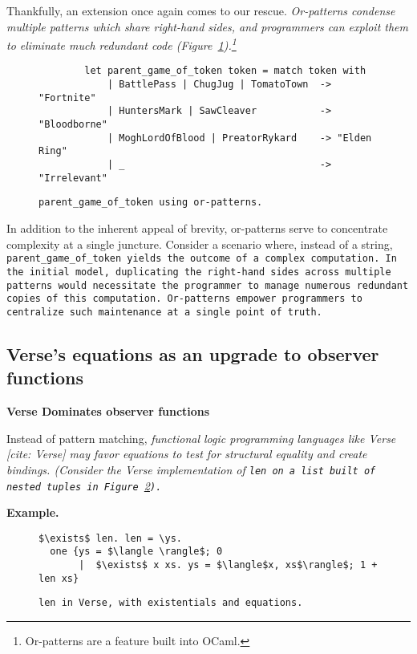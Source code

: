 \documentclass[manuscript,screen,review, 12pt]{acmart}
\begin{document}
\begin{outline}[enumerate]
Thankfully, an extension once again comes to our rescue. \it{Or-patterns}
condense multiple patterns which share right-hand sides, and programmers can
exploit them to eliminate much redundant code
(Figure~\ref{fig:orpgot}).\footnote{Or-patterns are a feature built into OCaml.}

    \begin{figure}
    \begin{center}
    \begin{verbatim}
        let parent_game_of_token token = match token with 
            | BattlePass | ChugJug | TomatoTown  -> "Fortnite"
            | HuntersMark | SawCleaver           -> "Bloodborne"
            | MoghLordOfBlood | PreatorRykard    -> "Elden Ring"
            | _                                  -> "Irrelevant"
    \end{verbatim}
    \end{center}    
    \caption{\tt{parent\_game\_of\_token} using or-patterns.} 
    \label{fig:orpgot}
    \end{figure}

    In addition to the inherent appeal of brevity, or-patterns serve to
    concentrate complexity at a single juncture. Consider a scenario where,
    instead of a string, \tt{parent\_game\_of\_token} yields the outcome of a
    complex computation. In the initial model, duplicating the right-hand sides
    across multiple patterns would necessitate the programmer to manage numerous
    redundant copies of this computation. Or-patterns empower programmers to
    centralize such maintenance at a single point of truth.
    
    \subsection{Verse's equations as an upgrade to observer functions}
    
    \1 \bf{Verse Dominates observer functions }

    Instead of pattern matching, \it{functional logic programming} languages
    like Verse [cite: Verse] may favor equations to test for structural equality
    and create bindings. (Consider the Verse implementation of \tt{len} on a
    list built of nested tuples in Figure~\ref{fig:verselen}).

    \2 \bf{Example.}

    \begin{figure}
        \verselst
        \begin{lstlisting}[numbers=none]
$\exists$ len. len = \ys. 
  one {ys = $\langle \rangle$; 0
       |  $\exists$ x xs. ys = $\langle$x, xs$\rangle$; 1 + len xs}
        \end{lstlisting}
    \caption{\tt{len} in Verse, with existentials and equations.} 
    \label{fig:verselen}
    \end{figure}
    

\end{outline}
\end{document}
